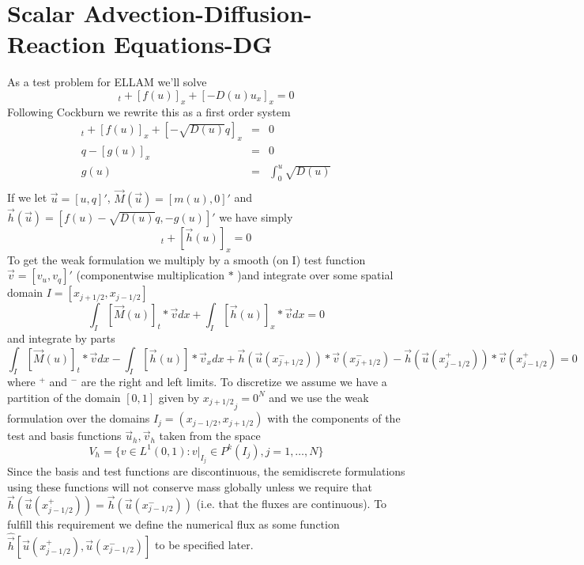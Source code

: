 \documentclass[10pt,dvips,twoside,reqno]{amsart}
\begin{document}
\section{Scalar Advection-Diffusion-Reaction Equations-DG}

As a test problem for ELLAM we'll solve
\begin{equation}
[m(u)]_t + [f(u)]_x + [-D(u) u_x]_x = 0
\end{equation}
Following Cockburn we rewrite this as a first order system
\begin{eqnarray}
[m(u)]_t + [f(u)]_x + [-  \sqrt{D(u)} q]_x &=& 0 \\
q  - [g(u)]_x &=& 0 \\
g(u) &=& \int_0^u \sqrt{D(u)} \\
\end{eqnarray}
If we let $\vec u =[u,q]'$, $\vec M(\vec u) =[m(u),0]'$ and $\vec h(\vec u) = [f(u) - \sqrt{D(u)} q,-g(u)]'$ we have simply
\begin{equation}
[\vec M(u)]_t + [\vec h(u)]_x =0
\end{equation}
To get the weak formulation we multiply by a smooth (on I) test function $\vec v=[v_u,v_q]'$ (componentwise multiplication $*$ )and integrate over some spatial domain $I=[x_{j+1/2},x_{j-1/2}]$
\begin{equation}
\int_I [\vec M(u)]_t * \vec v dx + \int_I [\vec h(u)]_x * \vec v dx=0
\end{equation}
and integrate by parts
\begin{equation}
\int_I [\vec M(u)]_t * \vec v dx - \int_I [\vec h(u)] * \vec v_x dx
+\vec h( \vec u(x^-_{j+1/2})) * \vec v(x^-_{j+1/2}) -\vec h( \vec u(x^+_{j-1/2})) * \vec v(x^+_{j-1/2}) = 0 
\end{equation}
where $^+$ and $^-$ are the right and left limits.
To discretize we assume we have a partition of the domain $[0,1]$
given by ${x_{j+1/2}}_j=0^N$ and we use the weak formulation over the
domains $I_j=(x_{j-1/2},x_{j+1/2})$ with the components of the test
and basis functions $\vec u_h, \vec v_h$ taken from the space
\begin{equation}
V_h = \{ v \in L^1(0,1): v|_{I_j} \in P^k(I_j),j=1,\ldots,N \}
\end{equation}
Since the basis and test functions are discontinuous, the semidiscrete
formulations using these functions will not conserve mass globally
unless we require that $\vec h( \vec u(x^+_{j-1/2})) = \vec h( \vec
u(x^-_{j-1/2}))$ (i.e. that the fluxes are continuous). To fulfill this
requirement we define the numerical flux as some function $\hat{\vec
  h}[\vec u(x^+_{j-1/2}),\vec u(x^-_{j-1/2})]$ to be specified later.
\end{document}
